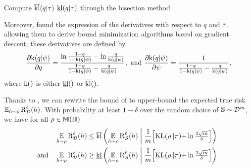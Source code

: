 \begin{algorithm}[ht!]
   \caption{Compute $\overline{\operatorname{kl}}(q|\tau)$ \resp $\underline{\operatorname{kl}}(q|\tau)$ through the bisection method}
  \begin{algorithmic}
    \EndFor
    \end{algorithmic}
    \label{chap:pac-bayes:algo:kl}
\end{algorithm}

Moreover, \citet{ReebDoerrGerwinnRakitsch2018} found the expression of the derivatives with respect to $q$ and $\tau$, allowing them to derive bound minimization algorithms based on gradient descent; these derivatives are defined by
\begin{align}
    \frac{\partial {\rm k(}q|\psi)}{\partial q} = \frac{\ln\frac{1-q}{1-{\rm k(}q|\psi)}-\ln\frac{q}{{\rm k(}q|\psi)}}{\frac{1-q}{1-{\rm k(}q|\psi)}-\frac{q}{{\rm k(}q|\psi)}}, \text{ and } \frac{\partial {\rm k(}q|\psi)}{\partial \psi} = \frac{1}{\frac{1-q}{1-{\rm k(}q|\psi)}-\frac{q}{{\rm k(}q|\psi)}},\label{chap:pac-bayes:eq:deriv-kl}
\end{align}
where ${\rm k}()$ is either $\underline{\operatorname{kl}}()$ or $\overline{\operatorname{kl}}()$.

Thanks to , we can rewrite the bound of  to upper-bound the expected true risk $\operatorname*{\mathbb{E}}_{h\sim\rho}\text{R}^{\ell}_{\mathcal{D}}(h)$.
With probability at least $1-\delta$ over the random choice of $\mathbb{S}\sim\mathcal{D}^m$, we have for all $\rho\in\mathbb{M}(\mathbb{H})$
\begin{align}
    &\operatorname*{\mathbb{E}}_{h\sim\rho}\text{R}^{\ell}_{\mathcal{D}}(h) \le \overline{\operatorname{kl}}\left(\operatorname*{\mathbb{E}}_{h\sim\rho}\text{R}^{\ell}_{\mathcal{S}}(h) \;\middle|\; \frac{1}{m}\!\left[\operatorname{KL}(\rho\|\pi){+}\ln\tfrac{2\sqrt{m}}{\delta}\right]\right)\label{chap:pac-bayes:eq:klmax-seeger}\\
    \text{and}\quad &\operatorname*{\mathbb{E}}_{h\sim\rho}\text{R}^{\ell}_{\mathcal{D}}(h) \ge \underline{\operatorname{kl}}\left(\operatorname*{\mathbb{E}}_{h\sim\rho}\text{R}^{\ell}_{\mathcal{S}}(h) \;\middle|\; \frac{1}{m}\!\left[\operatorname{KL}(\rho\|\pi){+}\ln\tfrac{2\sqrt{m}}{\delta}\right]\right).\label{chap:pac-bayes:eq:klmin-seeger}
\end{align}

